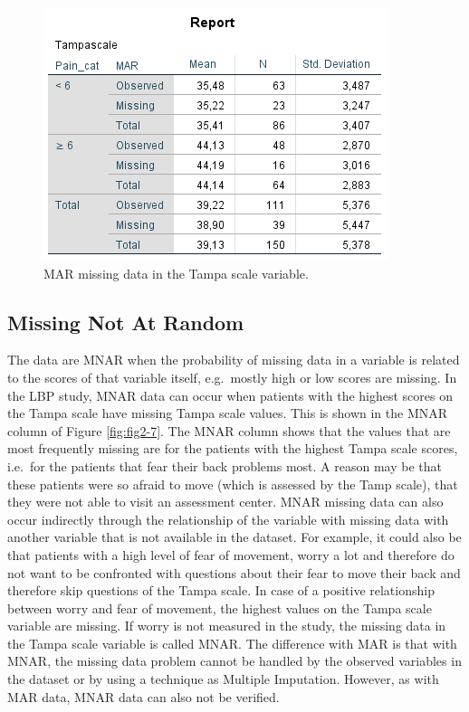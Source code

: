 \documentclass[]{book}
\begin{document}
\begin{figure}

{\centering \includegraphics[width=0.9\linewidth]{images/tab2.3} 

}

\caption{MAR missing data in the Tampa scale variable.}\label{fig:tab2-3}
\end{figure}

\subsection{Missing Not At Random}\label{missing-not-at-random}

The data are MNAR when the probability of missing data in a variable is
related to the scores of that variable itself, e.g.~mostly high or low
scores are missing. In the LBP study, MNAR data can occur when patients
with the highest scores on the Tampa scale have missing Tampa scale
values. This is shown in the MNAR column of Figure \ref{fig:fig2-7}. The
MNAR column shows that the values that are most frequently missing are
for the patients with the highest Tampa scale scores, i.e.~for the
patients that fear their back problems most. A reason may be that these
patients were so afraid to move (which is assessed by the Tamp scale),
that they were not able to visit an assessment center. MNAR missing data
can also occur indirectly through the relationship of the variable with
missing data with another variable that is not available in the dataset.
For example, it could also be that patients with a high level of fear of
movement, worry a lot and therefore do not want to be confronted with
questions about their fear to move their back and therefore skip
questions of the Tampa scale. In case of a positive relationship between
worry and fear of movement, the highest values on the Tampa scale
variable are missing. If worry is not measured in the study, the missing
data in the Tampa scale variable is called MNAR. The difference with MAR
is that with MNAR, the missing data problem cannot be handled by the
observed variables in the dataset or by using a technique as Multiple
Imputation. However, as with MAR data, MNAR data can also not be
verified.
\end{document}
